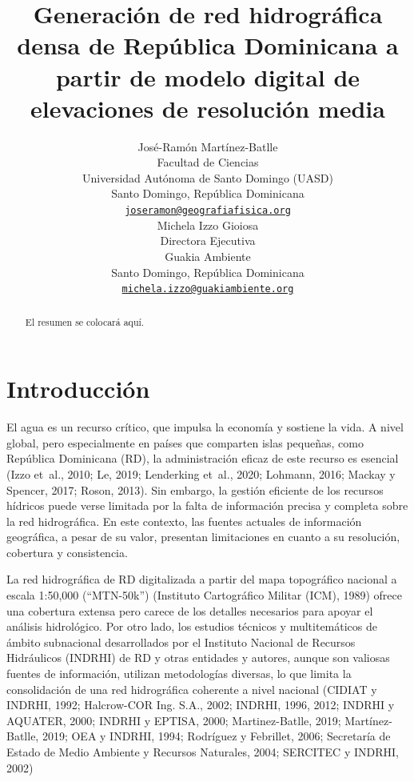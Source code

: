 \documentclass[spanish]{article}
\title{Generación de red hidrográfica densa de República Dominicana a
partir de modelo digital de elevaciones de resolución media}
\author{
    José-Ramón Martínez-Batlle\orcidlink{0000-0001-9924-0327}
   \\
    Facultad de Ciencias \\
    Universidad Autónoma de Santo Domingo (UASD) \\
  Santo Domingo, República Dominicana \\
  \texttt{\href{mailto:joseramon@geografiafisica.org}{\nolinkurl{joseramon@geografiafisica.org}}} \\
   \And
    Michela Izzo Gioiosa\orcidlink{0000-0003-4835-3967}
   \\
    Directora Ejecutiva \\
    Guakia Ambiente \\
  Santo Domingo, República Dominicana \\
  \texttt{\href{mailto:michela.izzo@guakiambiente.org}{\nolinkurl{michela.izzo@guakiambiente.org}}} \\
  }
\begin{document}
\maketitle


\begin{abstract}
El resumen se colocará aquí.
\end{abstract}


\hypertarget{introducciuxf3n}{%
\section{Introducción}\label{introducciuxf3n}}

El agua es un recurso crítico, que impulsa la economía y sostiene la
vida. A nivel global, pero especialmente en países que comparten islas
pequeñas, como República Dominicana (RD), la administración eficaz de
este recurso es esencial (Izzo et~al., 2010; Le, 2019; Lenderking
et~al., 2020; Lohmann, 2016; Mackay y Spencer, 2017; Roson, 2013). Sin
embargo, la gestión eficiente de los recursos hídricos puede verse
limitada por la falta de información precisa y completa sobre la red
hidrográfica. En este contexto, las fuentes actuales de información
geográfica, a pesar de su valor, presentan limitaciones en cuanto a su
resolución, cobertura y consistencia.

La red hidrográfica de RD digitalizada a partir del mapa topográfico
nacional a escala 1:50,000 (``MTN-50k'') (Instituto Cartográfico Militar
(ICM), 1989) ofrece una cobertura extensa pero carece de los detalles
necesarios para apoyar el análisis hidrológico. Por otro lado, los
estudios técnicos y multitemáticos de ámbito subnacional desarrollados
por el Instituto Nacional de Recursos Hidráulicos (INDRHI) de RD y otras
entidades y autores, aunque son valiosas fuentes de información,
utilizan metodologías diversas, lo que limita la consolidación de una
red hidrográfica coherente a nivel nacional (CIDIAT y INDRHI, 1992;
Halcrow-COR Ing. S.A., 2002; INDRHI, 1996, 2012; INDRHI y AQUATER, 2000;
INDRHI y EPTISA, 2000; Martinez-Batlle, 2019; Martínez-Batlle, 2019; OEA
y INDRHI, 1994; Rodríguez y Febrillet, 2006; Secretaría de Estado de
Medio Ambiente y Recursos Naturales, 2004; SERCITEC y INDRHI, 2002)
\end{document}
